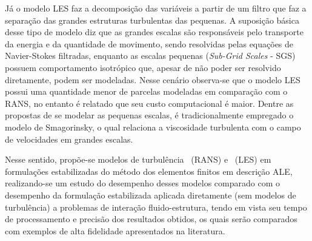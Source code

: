 Já o modelo LES faz a decomposição das variáveis a partir de um filtro que faz a separação das grandes estruturas turbulentas das pequenas. A suposição básica desse tipo de modelo diz que as grandes escalas são responsáveis pelo transporte da energia e da quantidade de movimento, sendo resolvidas pelas equações de Navier-Stokes filtradas, enquanto as escalas pequenas (\textit{Sub-Grid Scales} - SGS) possuem comportamento isotrópico que, apesar de não poder ser resolvido diretamente, podem ser modeladas. Nesse cenário observa-se que o modelo LES possui uma quantidade menor de parcelas modeladas em comparação com o RANS, no entanto é relatado que seu custo computacional é maior. Dentre as propostas de se modelar as pequenas escalas, é tradicionalmente empregado o modelo de Smagorinsky, o qual relaciona a viscosidade turbulenta com o campo de velocidades em grandes escalas.




Nesse sentido, propõe-se modelos de turbulência \RANS\ (RANS) e \LES\ (LES) em formulações estabilizadas do método dos elementos finitos em descrição ALE, realizando-se um estudo do desempenho desses modelos comparado com o desempenho da formulação estabilizada aplicada diretamente (sem modelos de turbulência) a problemas de interação fluido-estrutura, tendo em vista seu tempo de processamento e precisão dos resultados obtidos, os quais serão comparados com exemplos de alta fidelidade apresentados na literatura.

